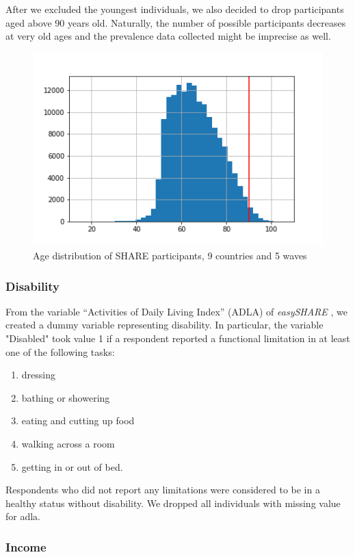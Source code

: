 \documentclass[\main/main.tex]{subfiles}
\begin{document}
After we excluded the youngest individuals, we also decided to drop participants aged above 90 years old. Naturally, the number of possible participants decreases at very old ages and the prevalence data collected might be imprecise as well.
\begin{figure}[H] 
    \centering
    \includegraphics[scale=.5]{images/age_distribution_90.png}
    \caption{Age distribution of SHARE participants, 9 countries and 5 waves}
\label{fig:age_distribution_2}
\end{figure}



\subsubsection{Disability}
From the variable “Activities of Daily Living Index” (ADLA)  of \textit{easySHARE} , we created a  dummy variable representing disability.  In particular,  the variable "Disabled" took value 1 if a respondent reported a functional limitation in at least one of the following tasks: 
\begin{enumerate}
\item dressing
\item bathing or showering
\item eating and cutting up food
\item walking across a room
\item getting in or out of bed.
\end{enumerate}

Respondents who did not report any limitations were considered to be in a healthy status without disability. We dropped all individuals with missing value for adla.

\subsubsection{Income}
\end{document}
